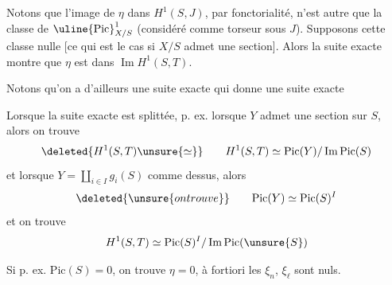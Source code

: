 Notons que l'image de $\eta$ dans $H^1(S,J)$, par fonctorialité, n'est autre que la classe de $\uline{\mathrm{Pic}}^1_{X/S}$ (considéré comme torseur sous $J$). Supposons cette classe nulle [ce qui est le cas si $X/S$ admet une section].  Alors la suite exacte
montre que \deleted{$\unsure{\eta}$} $\eta$ est dans $\operatorname{Im}H^1(S,T)$.

Notons qu'on a d'ailleurs une suite exacte 
qui donne une suite exacte 

Lorsque la suite exacte est splittée, p. ex. lorsque $Y$ admet une section sur $S$, alors on trouve
\[
\deleted{H^1(S,T)\unsure{\simeq}}\qquad H^1(S,T)\simeq\mathrm{Pic}(Y)/\operatorname{Im}\mathrm{Pic}(S)
\]
et lorsque $Y=\coprod_{i\in I}g_i(S)$ comme dessus, alors
\[
\deleted{\unsure{on trouve}}\qquad\mathrm{Pic}(Y)\simeq\mathrm{Pic}(S)^I
\]
et on trouve
\[
H^1(S,T)\simeq\mathrm{Pic}(S)^I/\operatorname{Im}\mathrm{Pic}(\unsure{S})
\]

Si p. ex. $\mathrm{Pic}(S)=0$, on trouve $\eta=0$, à fortiori les $\xi_n$, $\xi_\ell$ sont nuls.

